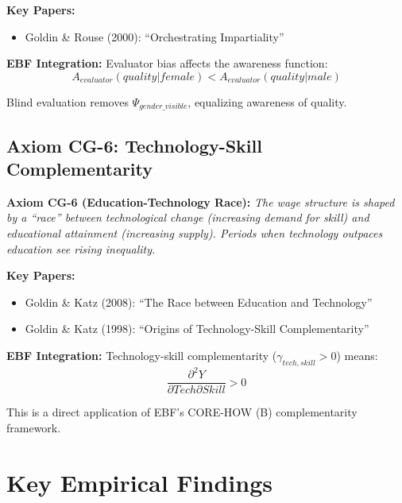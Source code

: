 \textbf{Key Papers:}
\begin{itemize}[nosep]
    \item Goldin \& Rouse (2000): ``Orchestrating Impartiality''
\end{itemize}

\textbf{EBF Integration:}
Evaluator bias affects the awareness function:
\begin{equation}
A_{evaluator}(quality | female) < A_{evaluator}(quality | male)
\end{equation}

Blind evaluation removes $\Psi_{gender\_visible}$, equalizing awareness of
quality.

\subsection{Axiom CG-6: Technology-Skill Complementarity}

\begin{tcolorbox}[colback=blue!5!white, colframe=blue!75!black]
\textbf{Axiom CG-6 (Education-Technology Race):}
\textit{The wage structure is shaped by a ``race'' between technological
change (increasing demand for skill) and educational attainment (increasing
supply). Periods when technology outpaces education see rising inequality.}
\end{tcolorbox}

\textbf{Key Papers:}
\begin{itemize}[nosep]
    \item Goldin \& Katz (2008): ``The Race between Education and Technology''
    \item Goldin \& Katz (1998): ``Origins of Technology-Skill Complementarity''
\end{itemize}

\textbf{EBF Integration:}
Technology-skill complementarity ($\gamma_{tech,skill} > 0$) means:
\begin{equation}
\frac{\partial^2 Y}{\partial Tech \partial Skill} > 0
\end{equation}

This is a direct application of EBF's CORE-HOW (B) complementarity framework.

\section{Key Empirical Findings}

